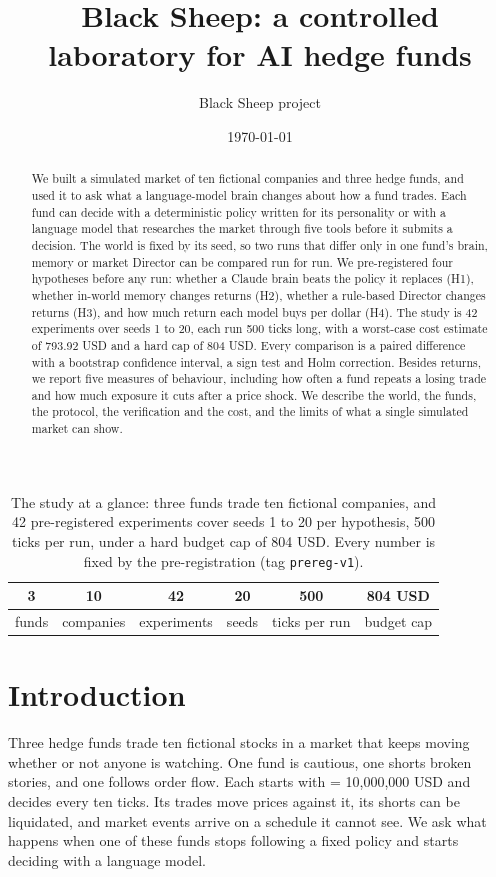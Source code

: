 \documentclass[11pt]{article}
\title{Black Sheep: a controlled laboratory for AI hedge funds}
\author{Black Sheep project}
\date{\today}
\newcommand{\cfg}[1]{\texttt{\detokenize{#1}}}
\begin{document}
\maketitle

\begin{abstract}
We built a simulated market of ten fictional companies and three hedge funds, and used it to ask what a language-model brain changes about how a fund trades. Each fund can decide with a deterministic policy written for its personality or with a language model that researches the market through five tools before it submits a decision. The world is fixed by its seed, so two runs that differ only in one fund's brain, memory or market Director can be compared run for run. We pre-registered four hypotheses before any run: whether a Claude brain beats the policy it replaces (H1), whether in-world memory changes returns (H2), whether a rule-based Director changes returns (H3), and how much return each model buys per dollar (H4). The study is 42 experiments over seeds 1 to 20, each run 500 ticks long, with a worst-case cost estimate of 793.92 USD and a hard cap of 804 USD. Every comparison is a paired difference with a bootstrap confidence interval, a sign test and Holm correction. Besides returns, we report five measures of behaviour, including how often a fund repeats a losing trade and how much exposure it cuts after a price shock. We describe the world, the funds, the protocol, the verification and the cost, and the limits of what a single simulated market can show.
\end{abstract}

\begin{table}[ht]
\centering
\begin{tabular}{cccccc}
\toprule
3 & 10 & 42 & 20 & 500 & 804 USD \\
\midrule
funds & companies & experiments & seeds & ticks per run & budget cap \\
\bottomrule
\end{tabular}
\caption{The study at a glance: three funds trade ten fictional companies, and 42 pre-registered experiments cover seeds 1 to 20 per hypothesis, 500 ticks per run, under a hard budget cap of 804 USD. Every number is fixed by the pre-registration (tag \texttt{prereg-v1}).}
\label{tab:glance}
\end{table}

\section{Introduction}
Three hedge funds trade ten fictional stocks in a market that keeps moving whether or not anyone is watching. One fund is cautious, one shorts broken stories, and one follows order flow. Each starts with \cfg{STARTING_CAPITAL} = 10{,}000{,}000 USD and decides every ten ticks. Its trades move prices against it, its shorts can be liquidated, and market events arrive on a schedule it cannot see. We ask what happens when one of these funds stops following a fixed policy and starts deciding with a language model.
\end{document}
